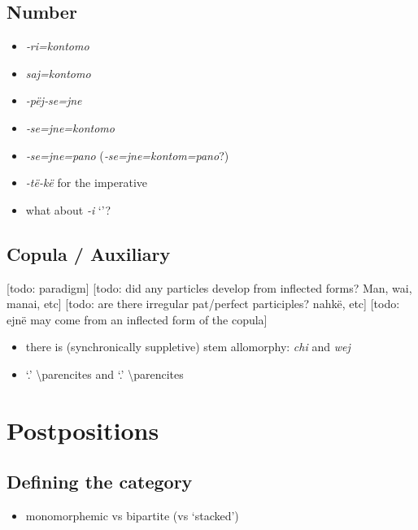 \documentclass{memoir}
\begin{document}
\section{Number}

\begin{itemize}
\tightlist
\item
  \emph{‑ri=kontomo}
\item
  \emph{saj=kontomo}
\item
  \emph{-pëj‑se=jne}
\item
  \emph{‑se=jne=kontomo}
\item
  \emph{‑se=jne=pano} (\emph{‑se=jne=kontom=pano}?)
\item
  \emph{-të-kë} for the imperative
\item
  what about \emph{-i} `'?
\end{itemize}

\section{Copula / Auxiliary}

{[}todo: paradigm{]} {[}todo: did any particles develop from inflected
forms? Man, wai, manai, etc{]} {[}todo: are there irregular pat/perfect
participles? nahkë, etc{]} {[}todo: ejnë may come from an inflected form
of the copula{]}

\begin{itemize}
\tightlist
\item
  there is (synchronically suppletive) stem allomorphy: \emph{chi} and
  \emph{wej}
\item
   `.' \textbackslash parencites and
   `.' \textbackslash parencites
\end{itemize}

\chapter{\texorpdfstring{Postpositions \label{postp}}{Postpositions }}

\section{Defining the category}

\begin{itemize}
\tightlist
\item
  monomorphemic vs bipartite (vs `stacked')
\end{itemize}
\end{document}
